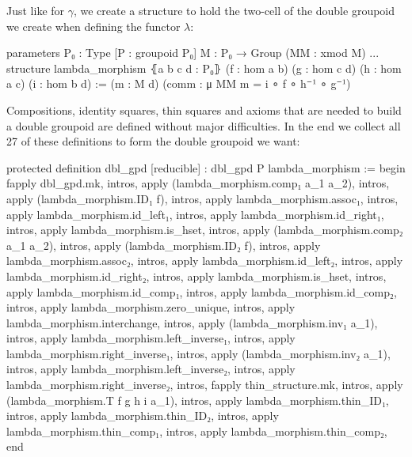 Just like for $\gamma$, we create a structure to hold the two-cell of the double
groupoid we create when defining the functor $\lambda$:
\begin{leancode}
  parameters {P₀ : Type} [P : groupoid P₀] {M : P₀ → Group} (MM : xmod M)
  ...
  structure lambda_morphism ⦃a b c d : P₀⦄
    (f : hom a b) (g : hom c d) (h : hom a c) (i : hom b d) :=
  (m : M d) (comm : μ MM m = i ∘ f ∘ h⁻¹ ∘ g⁻¹)
\end{leancode}

Compositions, identity squares, thin squares and axioms that are needed to build
a double groupoid are defined without major difficulties.
In the end we collect all 27 of these definitions to form the double groupoid we
want:
\begin{leancodebr}
  protected definition dbl_gpd [reducible] : dbl_gpd P lambda_morphism :=
  begin
    fapply dbl_gpd.mk,
      intros, apply (lambda_morphism.comp₁ a_1 a_2),
      intros, apply (lambda_morphism.ID₁ f),
      intros, apply lambda_morphism.assoc₁,
      intros, apply lambda_morphism.id_left₁,
      intros, apply lambda_morphism.id_right₁,
      intros, apply lambda_morphism.is_hset,
      intros, apply (lambda_morphism.comp₂ a_1 a_2),
      intros, apply (lambda_morphism.ID₂ f),
      intros, apply lambda_morphism.assoc₂,
      intros, apply lambda_morphism.id_left₂,
      intros, apply lambda_morphism.id_right₂,
      intros, apply lambda_morphism.is_hset,
      intros, apply lambda_morphism.id_comp₁,
      intros, apply lambda_morphism.id_comp₂,
      intros, apply lambda_morphism.zero_unique,
      intros, apply lambda_morphism.interchange,
      intros, apply (lambda_morphism.inv₁ a_1),
      intros, apply lambda_morphism.left_inverse₁,
      intros, apply lambda_morphism.right_inverse₁,
      intros, apply (lambda_morphism.inv₂ a_1),
      intros, apply lambda_morphism.left_inverse₂,
      intros, apply lambda_morphism.right_inverse₂,
      intros, fapply thin_structure.mk,
        intros, apply (lambda_morphism.T f g h i a_1),
        intros, apply lambda_morphism.thin_ID₁,
        intros, apply lambda_morphism.thin_ID₂,
        intros, apply lambda_morphism.thin_comp₁,
        intros, apply lambda_morphism.thin_comp₂,
  end
\end{leancodebr}

